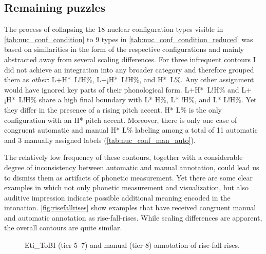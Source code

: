 \subsection{Remaining puzzles}
\label{ch:6.3.5}

The process of collapsing the 18 nuclear configuration types visible in \autoref{tab:nuc_conf_condition} to 9 types in \autoref{tab:nuc_conf_condition_reduced} was based on similarities in the form of the respective configurations and mainly abstracted away from several scaling differences. For three infrequent contours I did not achieve an integration into any broader category and therefore grouped them as \textit{other}: L+H*~L!H\%, L+¡H*~L!H\%, and H*~L\%. Any other assignment would have ignored key parts of their phonological form. L+H*~L!H\% and L+¡H*~L!H\% share a high final boundary with L* H\%, L* !H\%, and L* L!H\%. Yet they differ in the presence of a rising pitch accent. H* L\% is the only configuration with an H* pitch accent. Moreover, there is only one case of congruent automatic and manual H* L\% labeling among a total of 11 automatic and 3 manually assigned labels (\autoref{tab:nuc_conf_man_auto}).

The relatively low frequency of these contours, together with a considerable degree of inconsistency between automatic and manual annotation, could lead us to dismiss them as artifacts of phonetic measurement. Yet there are some clear examples in which not only phonetic measurement and visualization, but also auditive impression indicate possible additional meaning encoded in the intonation. \autoref{fig:risefallrises} show examples that have received congruent manual and automatic annotation as rise-fall-rises. While scaling differences are apparent, the overall contours are quite similar. 

\begin{sidewaysfigure}
	\centering
	\hspace{1em}%
	\hspace{1em}%
	\caption[Eti\_ToBI (tier 5--7) and manual (tier 8) annotation of rise-fall-rises]{Eti\_ToBI (tier 5--7) and manual (tier 8) annotation of rise-fall-rises.}\label{fig:risefallrises}
\end{sidewaysfigure}

